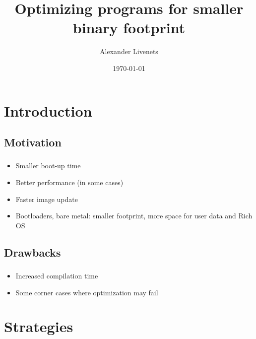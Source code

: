 \documentclass{beamer}
\title{Optimizing programs for smaller binary footprint}
\subtitle{}
\author{Alexander Livenets}
\institute{}
\date{\today}
\begin{document}

\begin{frame}
\titlepage
\end{frame}

\section{Introduction}

\subsection{Motivation}
\begin{frame}
\frametitle{\subsecname}
	\begin{itemize}
		\item Smaller boot-up time
		\item Better performance (in some cases)
		\item Faster image update
		\item Bootloaders, bare metal: smaller footprint, more space for user data and Rich OS
	\end{itemize}
\end{frame}

\subsection{Drawbacks}
\begin{frame}
\frametitle{\subsecname}
	\begin{itemize}
		\item Increased compilation time
		\item Some corner cases where optimization may fail
	\end{itemize}
\end{frame}

\section{Strategies}
\end{document}
